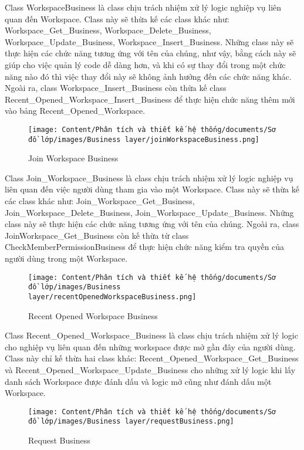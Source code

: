 \par
Class WorkspaceBusiness là class chịu trách nhiệm xử lý logic nghiệp vụ liên quan
đến Workspace. Class này sẽ thừa kế các class khác như: Workspace\_Get\_Business,
Workspace\_Delete\_Business, Workspace\_Update\_Business, Workspace\_Insert\_Business.
Những class này sẽ thực hiện các chức năng tương ứng với tên của chúng, như vậy,
bằng cách này sẽ giúp cho việc quản lý code dễ dàng hơn, và khi có sự thay đổi
trong một chức năng nào đó thì việc thay đổi này sẽ không ảnh hưởng đến các chức
năng khác. Ngoài ra, class Workspace\_Insert\_Business còn thừa kế class
Recent\_Opened\_Workspace\_Insert\_Business để thực hiện chức năng thêm mới vào 
bảng Recent\_Opened\_Workspace.
\begin{figure}[H]
    \centering
    \texttt{[image: Content/Phân tích và thiết kế hệ thống/documents/Sơ đồ lớp/images/Business layer/joinWorkspaceBusiness.png]}
    \vspace{0.5cm}
    \caption{Join Workspace Business}
    \label{fig:Join Workspace Business}
\end{figure}
\par
Class Join\_Workspace\_Business là class chịu trách nhiệm xử lý logic nghiệp vụ liên quan đến
việc người dùng tham gia vào một Workspace. Class này sẽ thừa kế các class khác như:
Join\_Workspace\_Get\_Business, Join\_Workspace\_Delete\_Business, Join\_Workspace\_Update\_Business.
Những class này sẽ thực hiện các chức năng tương ứng với tên của chúng. Ngoài ra, class
JoinWorkspace\_Get\_Business còn kế thừa từ class CheckMemberPermissionBusiness để thực hiện
chức năng kiểm tra quyền của người dùng trong một Workspace.
\begin{figure}[H]
    \centering
    \texttt{[image: Content/Phân tích và thiết kế hệ thống/documents/Sơ đồ lớp/images/Business layer/recentOpenedWorkspaceBusiness.png]}
    \vspace{0.5cm}
    \caption{Recent Opened Workspace Business}
    \label{fig:Recent Opened Workspace Business}
\end{figure}
\par
Class Recent\_Opened\_Workspace\_Business là class chịu trách nhiệm xử lý logic
cho nghiệp vụ liên quan đến những workspace được mở gần đây của người dùng.
Class này chỉ kế thừa hai class khác: Recent\_Opened\_Workspace\_Get\_Business và
Recent\_Opened\_Workspace\_Update\_Business cho những xử lý logic khi lấy danh sách 
Workspace được đánh dấu và logic mở cũng như đánh dấu một Workspace.
\begin{figure}[H]
    \centering
    \texttt{[image: Content/Phân tích và thiết kế hệ thống/documents/Sơ đồ lớp/images/Business layer/requestBusiness.png]}
    \vspace{0.5cm}
    \caption{Request Business}
    \label{fig:Request Business}
\end{figure}
